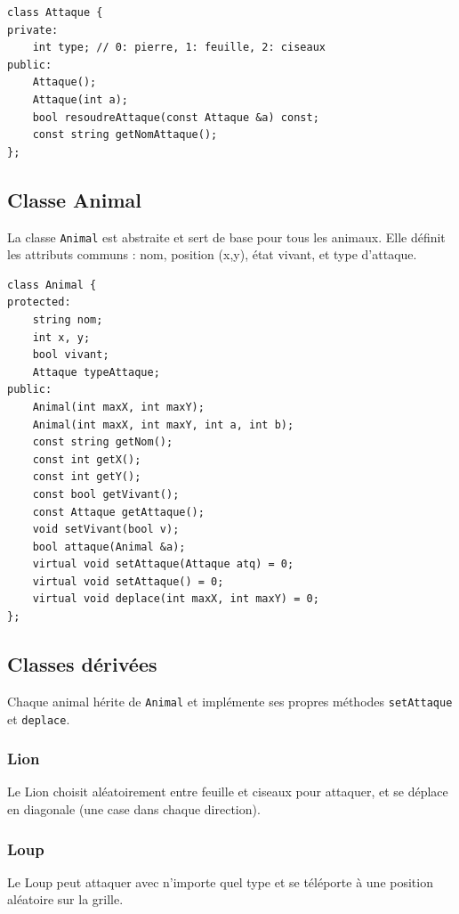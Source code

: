 \documentclass[a4paper,12pt,french]{article}
\begin{document}
\begin{verbatim}
class Attaque {
private:
    int type; // 0: pierre, 1: feuille, 2: ciseaux
public:
    Attaque();
    Attaque(int a);
    bool resoudreAttaque(const Attaque &a) const;
    const string getNomAttaque();
};
\end{verbatim}

\subsection{Classe Animal}

La classe \texttt{Animal} est abstraite et sert de base pour tous les animaux. Elle définit les attributs communs : nom, position (x,y), état vivant, et type d'attaque.

\begin{verbatim}
class Animal {
protected:
    string nom;
    int x, y;
    bool vivant;
    Attaque typeAttaque;
public:
    Animal(int maxX, int maxY);
    Animal(int maxX, int maxY, int a, int b);
    const string getNom();
    const int getX();
    const int getY();
    const bool getVivant();
    const Attaque getAttaque();
    void setVivant(bool v);
    bool attaque(Animal &a);
    virtual void setAttaque(Attaque atq) = 0;
    virtual void setAttaque() = 0;
    virtual void deplace(int maxX, int maxY) = 0;
};
\end{verbatim}

\subsection{Classes dérivées}

Chaque animal hérite de \texttt{Animal} et implémente ses propres méthodes \texttt{setAttaque} et \texttt{deplace}.

\subsubsection{Lion}

Le Lion choisit aléatoirement entre feuille et ciseaux pour attaquer, et se déplace en diagonale (une case dans chaque direction).

\subsubsection{Loup}

Le Loup peut attaquer avec n'importe quel type et se téléporte à une position aléatoire sur la grille.
\end{document}
